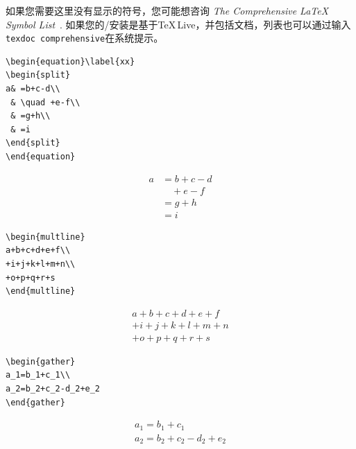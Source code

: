 如果您需要这里没有显示的符号，您可能想咨询 \emph{The Comprehensive \LaTeX{} Symbol List}~\cite{comprehensive}.
如果您的\lat/安装是基于\TeX\,Live，并包括文档，列表也可以通过输入\texttt{texdoc comprehensive}在系统提示。
\begin{table}[!htbp]
\caption[]{多线方程和方程组\\
 \phantom{Table 1:} (竖线表示标称边缘).}\small
\label{displays}
\bigskip
\begin{makeimage}
\begin{minipage}{\textwidth}
\begin{eqxample}
\begin{verbatim}
\begin{equation}\label{xx}
\begin{split}
a& =b+c-d\\
 & \quad +e-f\\
 & =g+h\\
 & =i
\end{split}
\end{equation}
\end{verbatim}
\producing
\begin{equation}\label{xx}
\begin{split}
a& =b+c-d\\
 & \quad +e-f\\
 & =g+h\\
 & =i
\end{split}
\end{equation}
\end{eqxample}

\begin{eqxample}
\begin{verbatim}
\begin{multline}
a+b+c+d+e+f\\
+i+j+k+l+m+n\\
+o+p+q+r+s
\end{multline}
\end{verbatim}
\producing
\begin{multline}
a+b+c+d+e+f\\
+i+j+k+l+m+n\\
+o+p+q+r+s
\end{multline}
\end{eqxample}

\begin{eqxample}
\begin{verbatim}
\begin{gather}
a_1=b_1+c_1\\
a_2=b_2+c_2-d_2+e_2
\end{gather}
\end{verbatim}
\producing
\begin{gather}
a_1=b_1+c_1\\
a_2=b_2+c_2-d_2+e_2
\end{gather}
\end{eqxample}


\end{minipage}
\end{makeimage}
\end{table}

